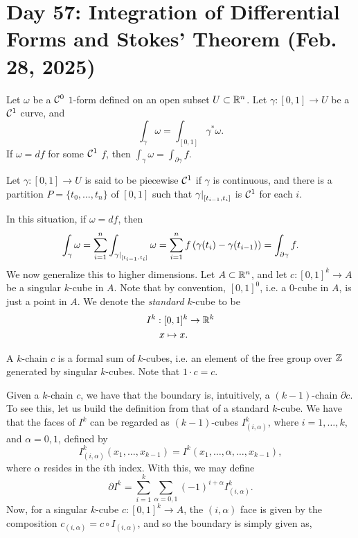 \section{Day 57: Integration of Differential Forms and Stokes' Theorem (Feb. 28, 2025)}
Let $\omega$ be a $\mathcal C^0$ $1$-form defined on an open subset $U \subset \mathbb R^n$. Let $\gamma : [0, 1] \to U$ be a $\mathcal C^1$ curve, and
\[ \int_\gamma \omega = \int_{[0, 1]} \gamma^\ast \omega. \]
If $\omega = df$ for some $\mathcal C^1$ $f$, then $\int_\gamma \omega = \int_{\partial \gamma} f$.
\begin{definition}
    Let $\gamma : [0, 1] \to U$ is said to be piecewise $\mathcal C^1$ if $\gamma$ is continuous, and there is a partition $P = \{t_0, \dots, t_n\}$ of $[0, 1]$ such that $\restr{\gamma}{[t_{i-1}, t_i]}$ is $\mathcal C^1$ for each $i$.
\end{definition}
\noindent In this situation, if $\omega = df$, then
\[ \int_\gamma \omega = \sum_{i=1}^n \int_{\restr{\gamma}{[t_{i-1}, t_i]}} \omega = \sum_{i=1}^n f\left(\gamma(t_i) - \gamma(t_{i-1})\right) = \int_{\partial \gamma} f. \]
We now generalize this to higher dimensions. Let $A \subset \mathbb R^n$, and let $c : [0, 1]^k \to A$ be a singular $k$-cube in $A$. Note that by convention, $[0, 1]^0$, i.e. a $0$-cube in $A$, is just a point in $A$. We denote the \textit{standard} $k$-cube to be
\begin{align*}
    I^k : [0, 1]^k &\to \mathbb R^k \\
    x \mapsto x.
\end{align*}
\vspace{-0.37in}
\begin{definition}
    A $k$-chain $c$ is a formal sum of $k$-cubes, i.e. an element of the free group over $\mathbb Z$ generated by singular $k$-cubes. Note that $1 \cdot c = c$.
\end{definition}
\noindent Given a $k$-chain $c$, we have that the boundary is, intuitively, a $(k-1)$-chain $\partial c$. To see this, let us build the definition from that of a standard $k$-cube. We have that the faces of $I^k$ can be regarded as $(k-1)$-cubes $I^k_{(i, \alpha)}$, where $i = 1, \dots, k$, and $\alpha = 0, 1$, defined by
\[ I^k_{(i, \alpha)} (x_1, \dots, x_{k-1}) = I^k (x_1, \dots, \alpha, \dots, x_{k-1}), \]
where $\alpha$ resides in the $i$th index. With this, we may define
\[ \partial I^k = \sum_{i=1}^k \sum_{\alpha = 0, 1} (-1)^{i + \alpha} I^k_{(i, \alpha)}. \]
Now, for a singular $k$-cube $c : [0, 1]^k \to A$, the $(i, \alpha)$ face is given by the composition $c_{(i, \alpha)} = c \circ I_{(i, \alpha)}$, and so the boundary is simply given as,
